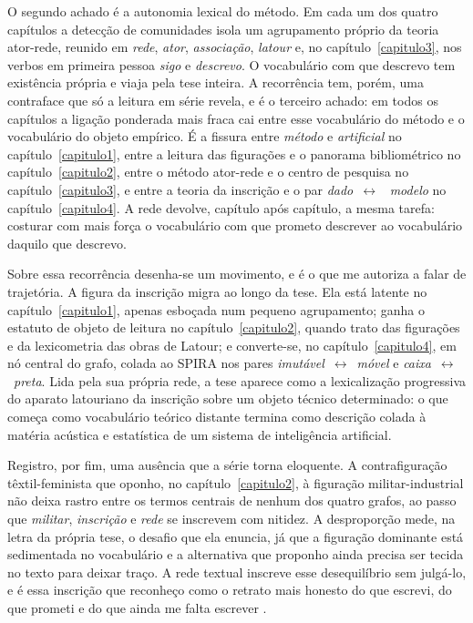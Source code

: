 O segundo achado é a autonomia lexical do método. Em cada um dos quatro
capítulos a detecção de comunidades isola um agrupamento próprio da
teoria ator-rede, reunido em \textit{rede}, \textit{ator},
\textit{associação}, \textit{latour} e, no capítulo~\ref{capitulo3},
nos verbos em primeira pessoa \textit{sigo} e \textit{descrevo}. O
vocabulário com que descrevo tem existência própria e viaja pela tese
inteira. A recorrência tem, porém, uma contraface que só a leitura em
série revela, e é o terceiro achado: em todos os capítulos a ligação
ponderada mais fraca cai entre esse vocabulário do método e o vocabulário
do objeto empírico. É a fissura entre \textit{método} e
\textit{artificial} no capítulo~\ref{capitulo1}, entre a leitura das
figurações e o panorama bibliométrico no capítulo~\ref{capitulo2}, entre
o método ator-rede e o centro de pesquisa no capítulo~\ref{capitulo3}, e
entre a teoria da inscrição e o par \textit{dado}~$\leftrightarrow$~%
\textit{modelo} no capítulo~\ref{capitulo4}. A rede devolve, capítulo
após capítulo, a mesma tarefa: costurar com mais força o vocabulário com
que prometo descrever ao vocabulário daquilo que descrevo.

Sobre essa recorrência desenha-se um movimento, e é o que me autoriza a
falar de trajetória. A figura da inscrição migra ao longo da tese. Ela
está latente no capítulo~\ref{capitulo1}, apenas esboçada num pequeno
agrupamento; ganha o estatuto de objeto de leitura no
capítulo~\ref{capitulo2}, quando trato das figurações e da lexicometria
das obras de Latour; e converte-se, no capítulo~\ref{capitulo4}, em nó
central do grafo, colada ao SPIRA nos pares
\textit{imutável}~$\leftrightarrow$~\textit{móvel} e
\textit{caixa}~$\leftrightarrow$~\textit{preta}. Lida pela sua própria
rede, a tese aparece como a lexicalização progressiva do aparato
latouriano da inscrição sobre um objeto técnico determinado: o que
começa como vocabulário teórico distante termina como descrição colada à
matéria acústica e estatística de um sistema de inteligência artificial.

Registro, por fim, uma ausência que a série torna eloquente. A
contrafiguração têxtil-feminista que oponho, no capítulo~\ref{capitulo2},
à figuração militar-industrial não deixa rastro entre os termos centrais
de nenhum dos quatro grafos, ao passo que \textit{militar},
\textit{inscrição} e \textit{rede} se inscrevem com nitidez. A
desproporção mede, na letra da própria tese, o desafio que ela enuncia,
já que a figuração dominante está sedimentada no vocabulário e a
alternativa que proponho ainda precisa ser tecida no texto para deixar
traço. A rede textual inscreve esse desequilíbrio sem julgá-lo, e é
essa inscrição que reconheço como o retrato mais honesto do que escrevi,
do que prometi e do que ainda me falta escrever \parencite[p.~143]{Law2004After}.
